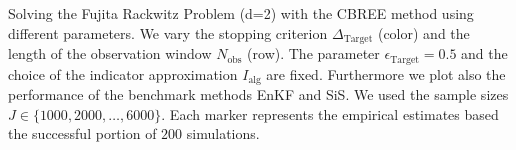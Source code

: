 Solving the Fujita Rackwitz Problem (d=2) with the CBREE method using  different parameters. We vary the stopping criterion $\Delta_{\text{Target}}$ (color) and the length of the observation window $N_\text{obs}$ (row). The parameter $\epsilon_{\text{Target}} = 0.5$ and the choice of the indicator approximation $I_\text{alg}$ are fixed. Furthermore we plot also the performance of the benchmark methods EnKF and SiS. We used the sample sizes $J \in \{1000, 2000, \ldots, 6000\}$. Each marker represents the empirical estimates based the successful portion of $200$ simulations.